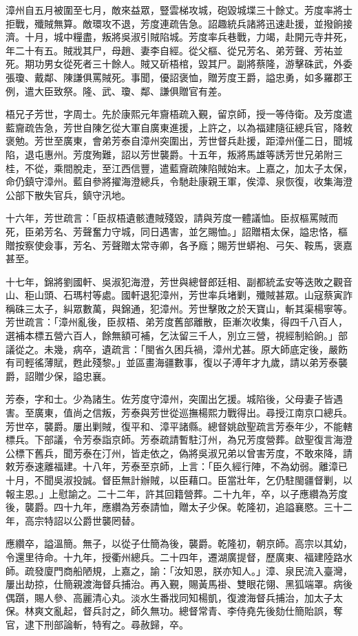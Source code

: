 \begin{pinyinscope}
漳州自五月被圍至七月，敵來益眾，豎雲梯攻城，砲毀城堞三十餘丈。芳度率將士拒戰，殲賊無算。敵環攻不退，芳度連疏告急。詔趣統兵諸將迅速赴援，並撥餉接濟。十月，城中糧盡，叛將吳淑引賊陷城。芳度率兵巷戰，力竭，赴開元寺井死，年二十有五。賊戕其尸，母趙、妻李自經。從父樞、從兄芳名、弟芳聲、芳祐並死。期功男女從死者三十餘人。賊又斫梧棺，毀其尸。副將蔡隆，游擊硃武，外委張瓊、戴鄰、陳謙俱罵賊死。事聞，優詔褒恤，贈芳度王爵，謚忠勇，如多羅郡王例，遣大臣致祭。隆、武、瓊、鄰、謙俱贈官有差。

梧兄子芳世，字周士。先於康熙元年齎梧疏入覲，留京師，授一等侍衛。及芳度遣藍齎疏告急，芳世自陳乞從大軍自廣東進援，上許之，以為福建隨征總兵官，降敕褒勉。芳世至廣東，會弟芳泰自漳州突圍出，芳世督兵赴援，距漳州僅二日，聞城陷，退屯惠州。芳度殉難，詔以芳世襲爵。十五年，叛將馬雄等誘芳世兄弟附三桂，不從，乘間脫走，至江西信豐，遣藍齎疏陳陷賊始末。上嘉之，加太子太保，命仍鎮守漳州。藍自參將擢海澄總兵，令馳赴康親王軍，俟漳、泉恢復，收集海澄公部下散失官兵，鎮守汛地。

十六年，芳世疏言：「臣叔梧遺骸遭賊殘毀，請與芳度一體議恤。臣叔樞罵賊而死，臣弟芳名、芳聲奮力守城，同日遇害，並乞賜恤。」詔贈梧太保，謚忠恪，樞贈按察使僉事，芳名、芳聲贈太常寺卿，各予廕；賜芳世蟒袍、弓矢、鞍馬，褒嘉甚至。

十七年，錦將劉國軒、吳淑犯海澄，芳世與總督郎廷相、副都統孟安等迭敗之觀音山、秬山頭、石瑪村等處。國軒退犯漳州，芳世率兵堵剿，殲賊甚眾。山寇蔡寅詐稱硃三太子，糾眾數萬，與錦通，犯漳州。芳世擊敗之於天寶山，斬其渠楊寧等。芳世疏言：「漳州亂後，臣叔梧、弟芳度舊部離散，臣漸次收集，得四千八百人，選補本標五營六百人，餘無額可補，乞汰留三千人，別立三營，視經制給餉。」部議從之。未幾，病卒，遺疏言：「閩省久困兵禍，漳州尤甚。原大師底定後，嚴飭有司輕徭薄賦，甦此殘黎。」並區畫海疆數事，復以子溥年才九歲，請以弟芳泰襲爵，詔贈少保，謚忠襄。

芳泰，字和士。少為諸生。佐芳度守漳州，突圍出乞援。城陷後，父母妻子皆遇害。至廣東，值尚之信叛，芳泰與芳世從巡撫楊熙力戰得出。尋授江南京口總兵。芳世卒，襲爵。屢出剿賊，復平和、漳平諸縣。總督姚啟聖疏言芳泰年少，不能轄標兵。下部議，令芳泰詣京師。芳泰疏請暫駐汀州，為兄芳度營葬。啟聖復言海澄公標下舊兵，聞芳泰在汀州，皆走依之，偽將吳淑兄弟以曾害芳度，不敢來降，請敕芳泰速離福建。十八年，芳泰至京師，上言：「臣久經行陣，不為幼弱。離漳已十月，不聞吳淑投誠。督臣無計辦賊，以臣藉口。臣當壯年，乞仍駐閩疆督剿，以報主恩。」上慰諭之。二十二年，許其回籍營葬。二十九年，卒，以子應纘為芳度後，襲爵。四十九年，應纘為芳泰請恤，贈太子少保。乾隆初，追謚襄愍。三十二年，高宗特詔以公爵世襲罔替。

應纘卒，謚溫簡。無子，以從子仕簡為後，襲爵。乾隆初，朝京師。高宗以其幼，令還里待命。十九年，授衢州總兵。二十四年，遷湖廣提督，歷廣東、福建陸路水師。疏發廈門商船陋規，上嘉之，諭：「汝知恩，朕亦知人。」漳、泉民流入臺灣，屢出劫掠，仕簡親渡海督兵捕治。再入覲，賜黃馬褂、雙眼花翎、黑狐端罩。病後偶躓，賜人參、高麗清心丸。淡水生番戕同知楊凱，復渡海督兵捕治，加太子太保。林爽文亂起，督兵討之，師久無功。總督常青、李侍堯先後劾仕簡貽誤，奪官，逮下刑部論斬，特宥之。尋赦歸，卒。


\end{pinyinscope}
